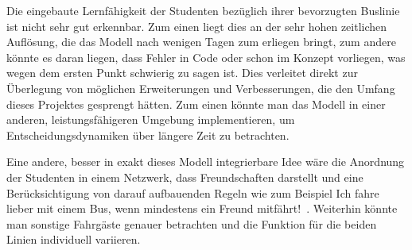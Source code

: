 \documentclass[12pt,a4paper]{scrartcl}
\begin{document}
Die eingebaute Lernfähigkeit der Studenten bezüglich ihrer bevorzugten Buslinie ist nicht sehr gut erkennbar. Zum einen liegt dies an der sehr hohen zeitlichen Auflösung, die das Modell nach wenigen Tagen zum erliegen bringt, zum andere könnte es daran liegen, dass Fehler in Code oder schon im Konzept vorliegen, was wegen dem ersten Punkt schwierig zu sagen ist.
Dies verleitet direkt zur Überlegung von möglichen Erweiterungen und Verbesserungen, die den Umfang dieses Projektes gesprengt hätten. Zum einen könnte man das Modell in einer anderen, leistungsfähigeren Umgebung implementieren, um Entscheidungsdynamiken über längere Zeit zu betrachten.

Eine andere, besser in exakt dieses Modell integrierbare Idee wäre die Anordnung der Studenten in einem Netzwerk, dass Freundschaften darstellt und eine Berücksichtigung von darauf aufbauenden Regeln wie zum Beispiel \glqq Ich fahre lieber mit einem Bus, wenn mindestens ein Freund mitfährt!\grqq~. Weiterhin könnte man sonstige Fahrgäste genauer betrachten und die Funktion für die beiden Linien individuell variieren.
\end{document}
